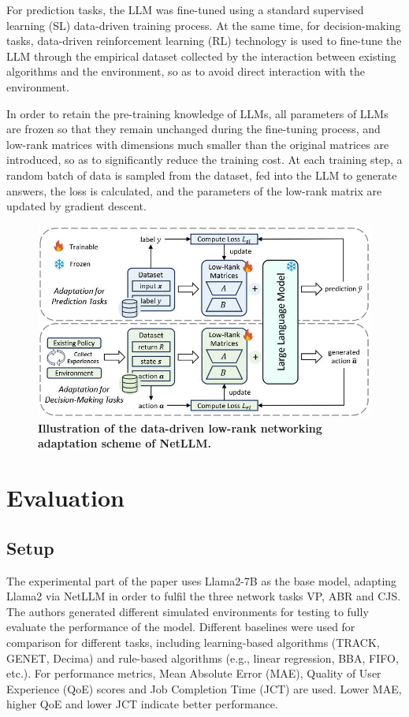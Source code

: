 \documentclass[twocolumn]{article}
\begin{document}
For prediction tasks, the LLM was fine-tuned using a standard supervised learning (SL) data-driven training process. At the same time, for decision-making tasks, data-driven reinforcement learning (RL) technology is used to fine-tune the LLM through the empirical dataset collected by the interaction between existing algorithms and the environment, so as to avoid direct interaction with the environment.

In order to retain the pre-training knowledge of LLMs, all parameters of LLMs are frozen so that they remain unchanged during the fine-tuning process, and low-rank matrices with dimensions much smaller than the original matrices are introduced, so as to significantly reduce the training cost. At each training step, a random batch of data is sampled from the dataset, fed into the LLM to generate answers, the loss is calculated, and the parameters of the low-rank matrix are updated by gradient descent.

\begin{figure}[t]
  \centering
  \includegraphics[width=1\linewidth]{img/figure10.jpg}
  \caption{\textbf{Illustration of the data-driven low-rank networking adaptation scheme of NetLLM.}}
  \label{fig:10}
\end{figure}

\section{Evaluation}

\subsection{Setup}
The experimental part of the paper uses Llama2-7B as the base model, adapting Llama2 via NetLLM in order to fulfil the three network tasks VP, ABR and CJS. The authors generated different simulated environments for testing to fully evaluate the performance of the model. Different baselines were used for comparison for different tasks, including learning-based algorithms (TRACK, GENET, Decima) and rule-based algorithms (e.g., linear regression, BBA, FIFO, etc.). For performance metrics, Mean Absolute Error (MAE), Quality of User Experience (QoE) scores and Job Completion Time (JCT) are used. Lower MAE, higher QoE and lower JCT indicate better performance.
\end{document}
